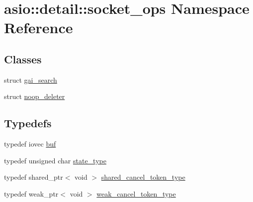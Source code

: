 \hypertarget{namespaceasio_1_1detail_1_1socket__ops}{}\section{asio\+:\+:detail\+:\+:socket\+\_\+ops Namespace Reference}
\label{namespaceasio_1_1detail_1_1socket__ops}
\subsection*{Classes}
\begin{DoxyCompactItemize}
\item 
struct \hyperlink{structasio_1_1detail_1_1socket__ops_1_1gai__search}{gai\+\_\+search}
\item 
struct \hyperlink{structasio_1_1detail_1_1socket__ops_1_1noop__deleter}{noop\+\_\+deleter}
\end{DoxyCompactItemize}
\subsection*{Typedefs}
\begin{DoxyCompactItemize}
\item 
typedef iovec \hyperlink{namespaceasio_1_1detail_1_1socket__ops_aac19d854d021af5882325264a1833c65}{buf}
\item 
typedef unsigned char \hyperlink{namespaceasio_1_1detail_1_1socket__ops_a5ce32ee297edef8833113ea35a933054}{state\+\_\+type}
\item 
typedef shared\+\_\+ptr$<$ void $>$ \hyperlink{namespaceasio_1_1detail_1_1socket__ops_a6f7dec33c65c050a3ee96d6b17dafc9c}{shared\+\_\+cancel\+\_\+token\+\_\+type}
\item 
typedef weak\+\_\+ptr$<$ void $>$ \hyperlink{namespaceasio_1_1detail_1_1socket__ops_a9dbe5bfa22a69dc9a583a8060228860f}{weak\+\_\+cancel\+\_\+token\+\_\+type}
\end{DoxyCompactItemize}

